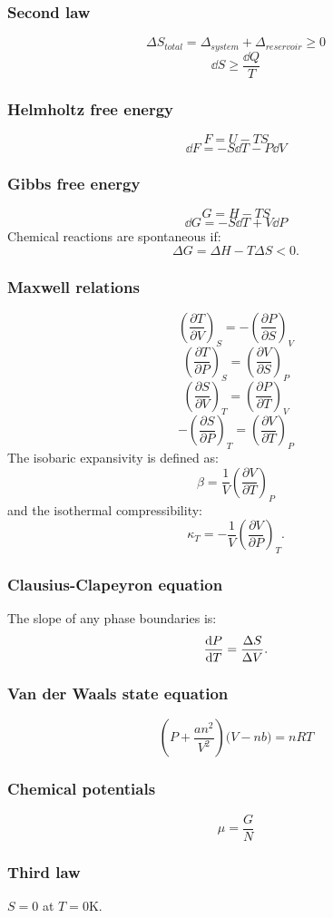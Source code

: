 \documentclass{article}
\begin{document}
\begin{multicols*}{3}
\subsubsection*{Second law}
$$\Delta S_{total}=\Delta_{system}
+\Delta_{reservoir}\geq0$$
$$\dd S\geq\frac{\dd Q}{T}$$

\subsubsection*{Helmholtz free energy}
$$F=U-TS$$
$$\dd F=-S\dd T-P\dd V$$

\subsubsection*{Gibbs free energy}
$$G=H-TS$$
$$\dd G=-S\dd T+V\dd P$$
Chemical reactions are spontaneous if:
$$\Delta G=\Delta H-T\Delta S<0.$$

\subsubsection*{Maxwell relations}
$$\left(\frac{\partial T}{\partial V}\right)_S=-\left(\frac{\partial P}{\partial S}\right)_V$$
$$\left(\frac{\partial T}{\partial P}\right)_S=\left(\frac{\partial V}{\partial S}\right)_P$$
$$\left(\frac{\partial S}{\partial V}\right)_T=\left(\frac{\partial P}{\partial T}\right)_V$$
$$-\left(\frac{\partial S}{\partial P}\right)_T=\left(\frac{\partial V}{\partial T}\right)_P$$
The isobaric expansivity is defined as:
$$\beta=\frac{1}{V}
\left(\frac{\partial V}{\partial T}\right)_P$$
and the isothermal compressibility:
$$\kappa_T=-\frac{1}{V}
\left(\frac{\partial V}{\partial P}\right)_T.$$

\subsubsection*{Clausius-Clapeyron equation}
The slope of any phase boundaries is:
$$\dv{P}{T}=\frac{\Delta S}{\Delta V}.$$

\subsubsection*{Van der Waals state equation}
$$\left(P+\frac{an^2}{V^2}\right)
\bigl(V-nb\bigr)=nRT$$

\subsubsection*{Chemical potentials}
$$\mu=\frac{G}{N}$$

\subsubsection*{Third law}
$S=0$ at $T=0$K.

\end{multicols*}
\end{document}
